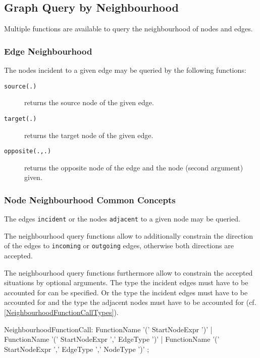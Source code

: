 \subsection{Graph Query by Neighbourhood}\label{sub:querybyneighbourhood}

Multiple functions are available to query the neighbourhood of nodes and edges.

\subsubsection*{Edge Neighbourhood}

The nodes incident to a given edge may be queried by the following functions: 

\begin{description}
\item[\texttt{source(.)}] returns the source node of the given edge.
\item[\texttt{target(.)}] returns the target node of the given edge.
\item[\texttt{opposite(.,.)}] returns the opposite node of the edge and the node (second argument) given.
\end{description}

\subsubsection*{Node Neighbourhood Common Concepts}

The edges \texttt{incident} or the nodes \texttt{adjacent} to a given node may be queried.

The neighbourhood query functions allow to additionally constrain the direction of the edges to \texttt{incoming} or \texttt{outgoing} edges, otherwise both directions are accepted.

The neighbourhood query functions furthermore allow to constrain the accepted situations by optional arguments. The type the incident edges must have to be accounted for can be specified. Or the type the incident edges must have to be accounted for and the type the adjacent nodes must have to be accounted for (cf. \ref{NeighbourhoodFunctionCallTypes}).

\begin{rail}
NeighbourhoodFunctionCall: 
  FunctionName '(' StartNodeExpr ')' |
  FunctionName '(' StartNodeExpr ',' EdgeType ')' |
  FunctionName '(' StartNodeExpr ',' EdgeType ',' NodeType ')'
  ;
\end{rail}\label{NeighbourhoodFunctionCallTypes}

